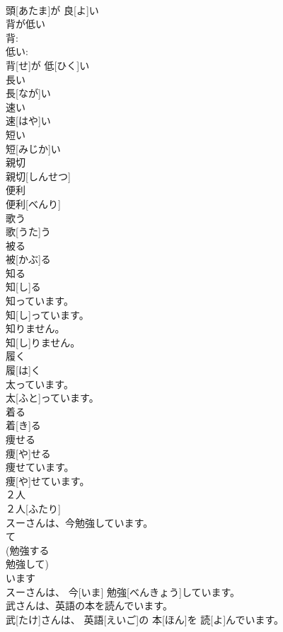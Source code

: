 \documentclass[8pt]{extreport}
\begin{document}
\begin{CJK}{UTF8}{min}
\\	頭[あたま]が 良[よ]い		
\\	背が低い	
\\	背: 
\\	低い: 
\\	背[せ]が 低[ひく]い		
\\	長い	
\\	長[なが]い		
\\	速い	
\\	速[はや]い		
\\	短い	
\\	短[みじか]い		
\\	親切	
\\	親切[しんせつ]		
\\	便利	
\\	便利[べんり]		
\\	歌う	
\\	歌[うた]う		
\\	被る	
\\	被[かぶ]る		
\\	知る	
\\	知[し]る		
\\	知っています。	
\\	知[し]っています。		
\\	知りません。	
\\	知[し]りません。		
\\	履く	
\\	履[は]く		
\\	太っています。	
\\	太[ふと]っています。		
\\	着る	
\\	着[き]る		
\\	痩せる	
\\	痩[や]せる		
\\	痩せています。	
\\	痩[や]せています。		
\\	２人	
\\	２人[ふたり]		
\\	スーさんは、今勉強しています。	
\\	て 
\\	(勉強する 
\\	勉強して) 
\\	います 
\\	スーさんは、 今[いま] 勉強[べんきょう]しています。	
\\	武さんは、英語の本を読んでいます。	
\\	武[たけ]さんは、 英語[えいご]の 本[ほん]を 読[よ]んでいます。	

\end{CJK}
\end{document}

